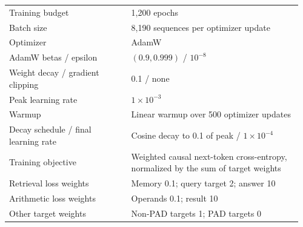 \begin{table}[p]
\begin{tabular}{@{}p{0.40\linewidth}p{0.56\linewidth}@{}}
Training budget & 1,200 epochs \\
Batch size & 8,190 sequences per optimizer update \\
Optimizer & AdamW \\
AdamW betas / epsilon & $(0.9,0.999)$ / $10^{-8}$ \\
Weight decay / gradient clipping & 0.1 / none \\
Peak learning rate & $1\times10^{-3}$ \\
Warmup & Linear warmup over 500 optimizer updates \\
Decay schedule / final learning rate & Cosine decay to 0.1 of peak / $1\times10^{-4}$ \\
Training objective & Weighted causal next-token cross-entropy, normalized by the sum of target weights \\
Retrieval loss weights & Memory 0.1; query target 2; answer 10 \\
Arithmetic loss weights & Operands 0.1; result 10 \\
Other target weights & Non-PAD targets 1; PAD targets 0 \\
\bottomrule
\end{tabular}
\end{table}
